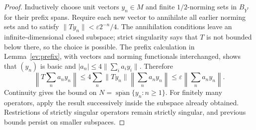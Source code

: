 \begin{proof}
Inductively choose unit vectors $y_n\in M$ and finite $1/2$-norming sets
in $B_{Y^*}$ for their prefix spans.  Require each new vector to annihilate
all earlier norming sets and to satisfy
$\|Ty_n\|<\varepsilon 2^{-n}/4$.
The annihilation conditions leave an infinite-dimensional closed
subspace; strict singularity says that $T$ is not bounded below there,
so the choice is possible.  The prefix calculation in
Lemma~\ref{ev:prefix}, with vectors and norming functionals interchanged,
shows that $(y_n)$ is basic and
$|a_n|\le4\|\sum_i a_i y_i\|$.  Therefore
\[
 \left\|T\sum_n a_n y_n\right\|
 \le4\sum_n\|Ty_n\|\left\|\sum_n a_n y_n\right\|
 \le\varepsilon\left\|\sum_n a_n y_n\right\|.
\]
Continuity gives the bound on
$N=\overline{\operatorname{span}}\{y_n:n\ge1\}$.
For finitely many operators, apply the result successively inside the
subspace already obtained.  Restrictions of strictly singular operators
remain strictly singular, and previous bounds persist on smaller subspaces.
\end{proof}

